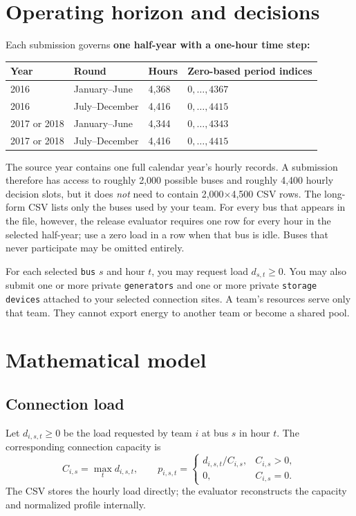 \documentclass[12pt]{article}
\newcommand{\code}[1]{\texttt{#1}}
\begin{document}
\section{Operating horizon and decisions}

Each submission governs \textbf{one half-year with a one-hour time step:}
\begin{center}
\begin{tabular}{llll}
\toprule
Year & Round & Hours & Zero-based period indices\\
\midrule
2016 & January--June & 4,368 & $0,\ldots,4367$\\
2016 & July--December & 4,416 & $0,\ldots,4415$\\
2017 or 2018 & January--June & 4,344 & $0,\ldots,4343$\\
2017 or 2018 & July--December & 4,416 & $0,\ldots,4415$\\
\bottomrule
\end{tabular}
\end{center}

The source year contains one full calendar year's hourly records. A submission therefore has
access to roughly 2,000 possible buses and roughly 4,400 hourly decision slots,
but it does \emph{not} need to contain 2,000$\times$4,500 CSV rows. The long-form
CSV lists only the buses used by your team. For every bus that appears in the
file, however, the release evaluator requires one row for every hour in the
selected half-year; use a zero load in a row when that bus is idle. Buses that
never participate may be omitted entirely.

For each selected \code{bus} $s$ and hour $t$, you may request load $d_{s,t}\ge 0$.
You may also submit one or more private \code{generators} and one or more private
\code{storage devices} attached to your selected connection sites. A team's resources
serve only that team. They cannot export energy to another team or become a
shared pool.

\section{Mathematical model}

\subsection{Connection load}

Let $d_{i,s,t} \geq 0$ be the load requested by team $i$ at bus $s$ in hour
$t$. The corresponding connection capacity is
\[
  C_{i,s}=\max_t d_{i,s,t},\qquad
  p_{i,s,t}=\begin{cases}d_{i,s,t}/C_{i,s},&C_{i,s}>0,\\0,&C_{i,s}=0.\end{cases}
\]
The CSV stores the hourly load directly; the evaluator reconstructs the
capacity and normalized profile internally.
\end{document}
